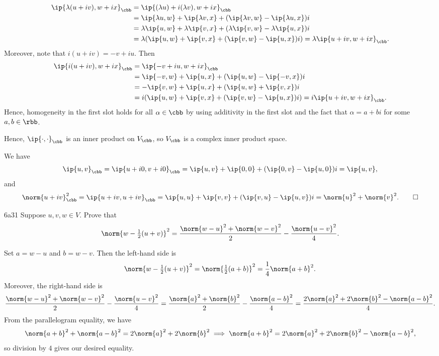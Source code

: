 \begin{solenum}
\begin{itemize}
\begin{align*}
            \ip{\lambda(u + iv), w + ix}_{\cbb} &= \ip{(\lambda u) + i(\lambda v), w + ix}_{\cbb} \\
            &= \ip{\lambda u, w} + \ip{\lambda v, x} + (\ip{\lambda v, w} - \ip{\lambda u, x})i \\
            &= \lambda\ip{u, w} + \lambda\ip{v, x} + (\lambda\ip{v, w} - \lambda\ip{u, x})i \\
            &= \lambda(\ip{u, w} + \ip{v, x} + (\ip{v, w} - \ip{u, x})i) = \lambda\ip{u + iv, w + ix}_{\cbb}.
        \end{align*}
        Moreover, note that $i(u + iv) = -v + iu$.
        Then
        \begin{align*}
            \ip{i(u + iv), w + ix}_{\cbb} &= \ip{-v + iu, w + ix}_{\cbb} \\
            &= \ip{-v, w} + \ip{u, x} + (\ip{u, w} - \ip{-v, x})i \\
            &= -\ip{v, w} + \ip{u, x} + (\ip{u, w} + \ip{v, x})i \\
            &= i(\ip{u, w} + \ip{v, x} + (\ip{v, w} - \ip{u, x})i) = i\ip{u + iv, w + ix}_{\cbb}.
        \end{align*}
        Hence, homogeneity in the first slot holds for all $\alpha \in \cbb$ by using additivity in the first slot and the fact that $\alpha = a + bi$ for some $a, b \in \rbb$.
    \end{itemize}
    Hence, $\ip{\cdot, \cdot}_{\cbb}$ is an inner product on $V_{\cbb}$, so $V_{\cbb}$ is a complex inner product space.
    \item We have
    \[
        \ip{u, v}_{\cbb} = \ip{u + i0, v + i0}_{\cbb} = \ip{u, v} + \ip{0, 0} + (\ip{0, v} - \ip{u, 0})i = \ip{u, v},
    \]
    and
    \[
        \norm{u + iv}_{\cbb}^2 = \ip{u + iv, u + iv}_{\cbb} = \ip{u, u} + \ip{v, v} + (\ip{v, u} - \ip{u, v})i = \norm{u}^2 + \norm{v}^2. \qedhere
    \]
\end{solenum}

\begin{exercise}{6a31}
    Suppose $u, v, w \in V$.
    Prove that
    \[
        \norm{w - \tfrac{1}{2}(u + v)}^2 = \frac{\norm{w - u}^2 + \norm{w - v}^2}{2} - \frac{\norm{u - v}^2}{4}.
    \]
\end{exercise}

\begin{sol}
    Set $a = w - u$ and $b = w - v$.
    Then the left-hand side is
    \[
        \norm{w - \tfrac{1}{2}(u + v)}^2 = \norm{\tfrac{1}{2}(a + b)}^2 = \frac{1}{4}\norm{a + b}^2.
    \]
    Moreover, the right-hand side is
    \[
        \frac{\norm{w - u}^2 + \norm{w - v}^2}{2} - \frac{\norm{u - v}^2}{4} = \frac{\norm{a}^2 + \norm{b}^2}{2} - \frac{\norm{a - b}^2}{4} = \frac{2\norm{a}^2 + 2\norm{b}^2 - \norm{a - b}^2}{4}.
    \]
    From the parallelogram equality, we have
    \[
        \norm{a + b}^2 + \norm{a - b}^2 = 2\norm{a}^2 + 2\norm{b}^2 \implies \norm{a + b}^2 = 2\norm{a}^2 + 2\norm{b}^2 - \norm{a - b}^2,
    \]
    so division by $4$ gives our desired equality.
\end{sol}

